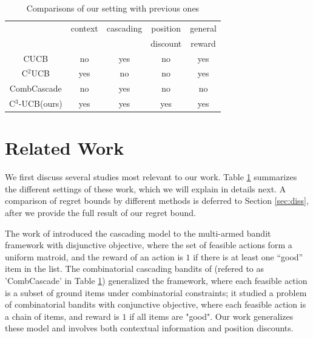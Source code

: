 \documentclass{article}
\newcommand{\shuai}[1]{{\color{brown!60!black} [\text{Shuai:} #1]}}
\begin{document}

\begin{table}
	\renewcommand{\arraystretch}{1.1}
	\centering
	\begin{tabular}{|c|c|c|c|c|}
		\hline
		 &context &cascading &position  & general \\
		 &         &          &discount & reward \\
		\hline
		CUCB &no &yes &no & yes \\
		\hline
		C$^2$UCB &yes &no &no & yes  \\
		\hline
		CombCascade	&no &yes &no  & no \\
		\hline
		C$^3$-UCB(ours) &yes &yes &yes & yes \\
		\hline
	\end{tabular}
	\caption{Comparisons of our setting with previous ones }
	\label{table:outline}
\end{table} 


\section{Related Work}

We first discuss several studies most relevant to our work.
Table \ref{table:outline} summarizes the different settings of these work, 
	which we will explain in details next.
A comparison of regret bounds by different methods is deferred to Section \ref{sec:diss},
	after we provide the full result of our regret bound.

The work of \cite{kveton2015cascading} introduced the cascading model to the multi-armed bandit framework with disjunctive objective, where the set of feasible actions form a uniform matroid, and the reward of an action is $1$ if there is at least one ``good'' item in the list. 
The combinatorial cascading bandits of \cite{kveton2015combinatorial} (refered to as 'CombCascade' in Table \ref{table:outline}) generalized the framework, where each feasible action is a subset of ground items under combinatorial constraints; it studied a problem of combinatorial bandits with conjunctive objective, where each feasible action is a chain of items, and reward is $1$ if all items are "good". 
Our work generalizes these model and involves both contextual information and position discounts.
\end{document}
